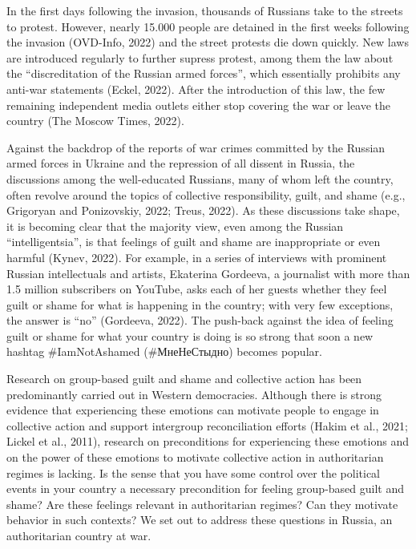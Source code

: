 \documentclass[
]{article}
\begin{document}
In the first days following the invasion, thousands of Russians take to the streets to protest. However, nearly 15.000 people are detained in the first weeks following the invasion (OVD-Info, 2022) and the street protests die down quickly. New laws are introduced regularly to further supress protest, among them the law about the ``discreditation of the Russian armed forces'', which essentially prohibits any anti-war statements (Eckel, 2022). After the introduction of this law, the few remaining independent media outlets either stop covering the war or leave the country (The Moscow Times, 2022).

Against the backdrop of the reports of war crimes committed by the Russian armed forces in Ukraine and the repression of all dissent in Russia, the discussions among the well-educated Russians, many of whom left the country, often revolve around the topics of collective responsibility, guilt, and shame (e.g., Grigoryan and Ponizovskiy, 2022; Treus, 2022). As these discussions take shape, it is becoming clear that the majority view, even among the Russian ``intelligentsia'', is that feelings of guilt and shame are inappropriate or even harmful (Kynev, 2022). For example, in a series of interviews with prominent Russian intellectuals and artists, Ekaterina Gordeeva, a journalist with more than 1.5 million subscribers on YouTube, asks each of her guests whether they feel guilt or shame for what is happening in the country; with very few exceptions, the answer is ``no'' (Gordeeva, 2022). The push-back against the idea of feeling guilt or shame for what your country is doing is so strong that soon a new hashtag \#IamNotAshamed (\#МнеНеСтыдно) becomes popular.

Research on group-based guilt and shame and collective action has been predominantly carried out in Western democracies. Although there is strong evidence that experiencing these emotions can motivate people to engage in collective action and support intergroup reconciliation efforts (Hakim et al., 2021; Lickel et al., 2011), research on preconditions for experiencing these emotions and on the power of these emotions to motivate collective action in authoritarian regimes is lacking. Is the sense that you have some control over the political events in your country a necessary precondition for feeling group-based guilt and shame? Are these feelings relevant in authoritarian regimes? Can they motivate behavior in such contexts? We set out to address these questions in Russia, an authoritarian country at war.
\end{document}
